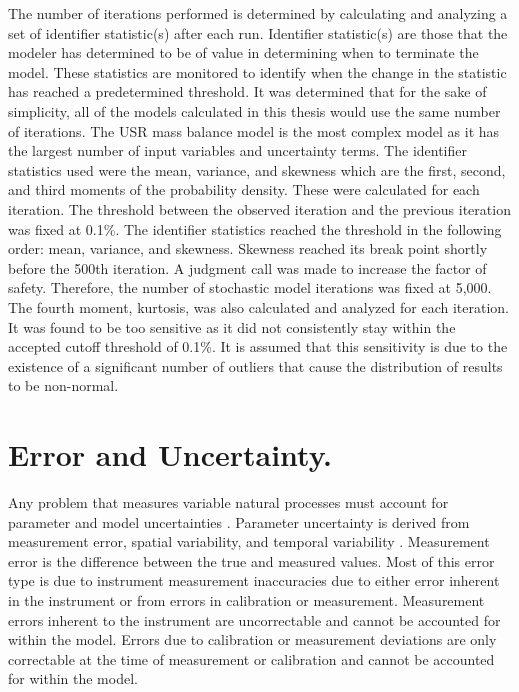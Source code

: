 \begin{linenumbers}
The number of iterations performed is determined by calculating and analyzing a set of identifier statistic(s) after each run.  Identifier statistic(s) are those that the modeler has determined to be of value in determining when to terminate the model.  These statistics are monitored to identify when the change in the statistic has reached a predetermined threshold.  It was determined that for the sake of simplicity, all of the models calculated in this thesis would use the same number of iterations.  The USR mass balance model is the most complex model as it has the largest number of input variables and uncertainty terms.  The identifier statistics used were the mean, variance, and skewness which are the first, second, and third moments of the probability density.  These were calculated for each iteration.  The threshold between the observed iteration and the previous iteration was fixed at 0.1\%.  The identifier statistics reached the threshold in the following order: mean, variance, and skewness.  Skewness reached its break point shortly before the 500th iteration.  A judgment call was made to increase the factor of safety.  Therefore, the number of stochastic model iterations was fixed at 5,000.  The fourth moment, kurtosis, was also calculated and analyzed for each iteration.  It was found to be too sensitive as it did not consistently stay within the accepted cutoff threshold of 0.1\%.  It is assumed that this sensitivity is due to the existence of a significant number of outliers that cause the distribution of results to be non-normal.

\section{Error and Uncertainty.}
\label{sec:ErrorAndUncertainty}

Any problem that measures variable natural processes must account for parameter and model uncertainties \parencite{vicens1975}.  Parameter uncertainty is derived from measurement error, spatial variability, and temporal variability \parencite{herschy2002}.  Measurement error is the difference between the true and measured values.  Most of this error type is due to instrument measurement inaccuracies due to either error inherent in the instrument or from errors in calibration or measurement.  Measurement errors inherent to the instrument are uncorrectable and cannot be accounted for within the model.  Errors due to calibration or measurement deviations are only correctable at the time of measurement or calibration and cannot be accounted for within the model.


\end{linenumbers}
